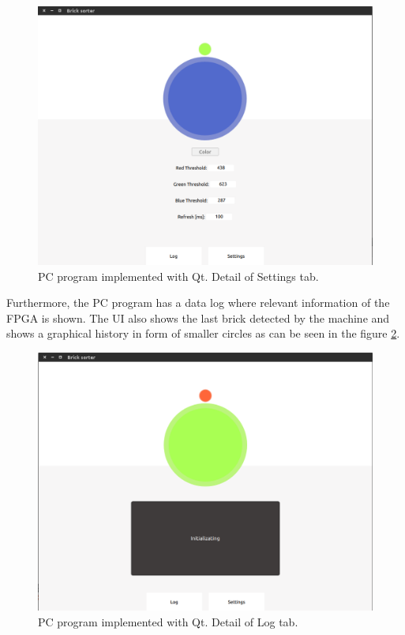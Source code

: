 	\begin{figure}[!ht]
		\centering
		\includegraphics[width=.7\textwidth]{figures/UI_settings}
		\caption{PC program implemented with Qt. Detail of Settings tab.}
		\label{fig:UI_settings}
	\end{figure}

Furthermore, the PC program has a data log where relevant information of the FPGA is shown. The UI also shows the last brick detected by the machine and shows a graphical history in form of smaller circles as can be seen in the figure \ref{fig:UI_log}.

	\begin{figure}[!ht]
		\centering
		\includegraphics[width=.7\textwidth]{figures/UI_log}
		\caption{PC program implemented with Qt. Detail of Log tab.}
		\label{fig:UI_log}
	\end{figure}

	